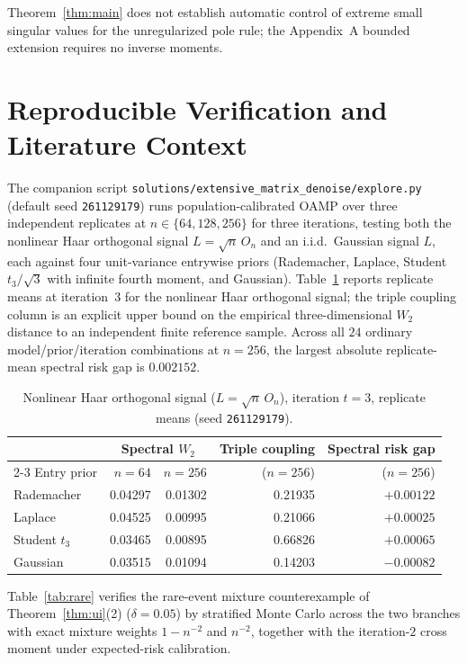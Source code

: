 \documentclass[11pt]{article}
\theoremstyle{plain}
\theoremstyle{definition}
\theoremstyle{remark}
\begin{document}
Theorem~\ref{thm:main} does not establish automatic control of extreme small singular values for the unregularized pole rule; the Appendix~A bounded extension requires no inverse moments.

\section{Reproducible Verification and Literature Context}\label{sec:verify}

The companion script \texttt{solutions/extensive\_matrix\_denoise/explore.py} (default seed \texttt{261129179}) runs population-calibrated OAMP over three independent replicates at $n \in \{64, 128, 256\}$ for three iterations, testing both the nonlinear Haar orthogonal signal $L = \sqrt{n}\,O_n$ and an i.i.d.\ Gaussian signal $L$, each against four unit-variance entrywise priors (Rademacher, Laplace, Student $t_3/\sqrt{3}$ with infinite fourth moment, and Gaussian).
Table~\ref{tab:haar} reports replicate means at iteration~$3$ for the nonlinear Haar orthogonal signal; the triple coupling column is an explicit upper bound on the empirical three-dimensional $W_2$ distance to an independent finite reference sample. Across all $24$ ordinary model/prior/iteration combinations at $n = 256$, the largest absolute replicate-mean spectral risk gap is $0.002152$.

\begin{table}[ht]
\centering
\caption{Nonlinear Haar orthogonal signal ($L = \sqrt{n}\,O_n$), iteration $t = 3$, replicate means (seed \texttt{261129179}).}
\label{tab:haar}
\smallskip
\begin{tabular}{@{}lrrrr@{}}
\toprule
& \multicolumn{2}{c}{Spectral $W_2$} & Triple coupling & Spectral risk gap \\
\cmidrule(lr){2-3}
Entry prior & $n = 64$ & $n = 256$ & ($n = 256$) & ($n = 256$) \\
\midrule
Rademacher    & 0.04297 & 0.01302 & 0.21935 & $+0.00122$ \\
Laplace       & 0.04525 & 0.00995 & 0.21066 & $+0.00025$ \\
Student $t_3$ & 0.03465 & 0.00895 & 0.66826 & $+0.00065$ \\
Gaussian      & 0.03515 & 0.01094 & 0.14203 & $-0.00082$ \\
\bottomrule
\end{tabular}
\end{table}

Table~\ref{tab:rare} verifies the rare-event mixture counterexample of Theorem~\ref{thm:ui}(2) ($\delta = 0.05$) by stratified Monte Carlo across the two branches with exact mixture weights $1 - n^{-2}$ and $n^{-2}$, together with the iteration-$2$ cross moment under expected-risk calibration.
\end{document}
